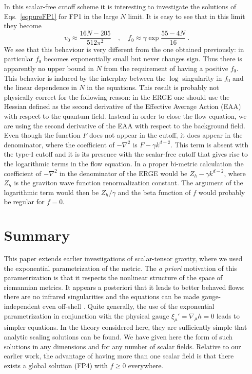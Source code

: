 \documentclass[11pt]{book} %
\newcommand{\be}{\begin{equation}}
\newcommand{\ee}{\end{equation}}
\numberwithin{equation}{chapter}
\begin{document}
In this scalar-free cutoff scheme it is interesting to investigate the solutions of
Eqs.~\eqref{eqpureFP1} for FP1 in the large $N$ limit.
It is easy to see that in this limit they become
\be
v_0\approx \frac{16N-205}{512\pi^2} \quad , \quad
f_0\approx \gamma\exp{\frac{55-4N}{16}}\ .
\ee
We see that this behaviour is very different from the one obtained previously:
in particular $f_0$ becomes exponentially small but never changes sign.
Thus there is apparently no upper bound in $N$ from the requirement of having a positive $f_0$.
This behavior is induced by the interplay between the $\log$ singularity
in $f_0$ and the linear dependence in $N$ in the equations.
This result is probably not physically correct for the following
reason: in the ERGE one should use the Hessian defined as the second
derivative of the Effective Average Action (EAA) with respect to the quantum field.
Instead in order to close the flow equation,
we are using the second derivative of the
EAA with respect to the background field.
Even though the function $F$ does not appear in the cutoff,
it does appear in the denominator, where the coefficient
of $-\nabla^2$ is $F-\gamma k^{d-2}$.
This term is absent with the type-I cutoff and
it is its presence with the scalar-free cutoff that gives rise
to the logarithmic terms in the flow equation.
In a proper bi-metric calculation the coefficient of
$-\nabla^2$ in the denominator of the ERGE
would be $Z_h-\gamma k^{d-2}$, where $Z_h$ is the graviton
wave function renormalization constant.
The argument of the logarithmic term would then be $Z_h/\gamma$
and the beta function of $f$ would probably be regular for $f=0$.

\section{Summary}

This paper extends earlier investigations of scalar-tensor
gravity, where we used the exponential parametrization of the metric.
The {\it a priori} motivation of this parametrization is that
it respects the nonlinear structure of the space of riemannian metrics.
It appears a posteriori that it leads to better behaved flows:
there are no infrared singularities \cite{Percacci:2015wwa,Falls:2015qga}
and the equations can be made gauge-independent even off-shell
\cite{Falls:2015qga}.
Quite generally, the use of the exponential parametrization
in conjunction with the physical gauge $\xi_\mu'=\nabla_\mu h=0$
leads to simpler equations.
In the theory considered here, they are sufficiently simple
that analytic scaling solutions can be found.
We have given here the form of such solutions in any dimensions
and for any number of scalar fields.
Relative to our earlier work, the advantage of having more than
one scalar field is that there exists a global solution (FP4)
with $f\geq 0$ everywhere.
\end{document}
